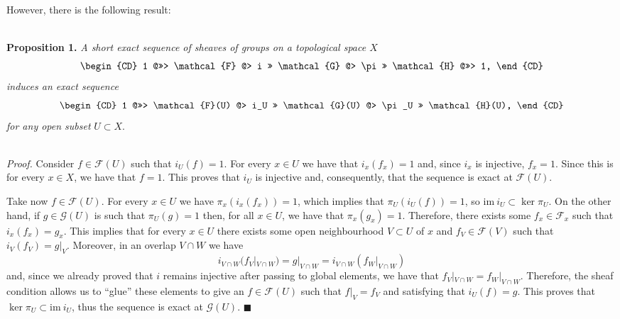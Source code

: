     However, there is the following result:

    \ \\
    \textbf{Proposition 1.} \textit{A short exact sequence of sheaves of groups on a topological space $X$}
    \begin{equation*}
      \begin{CD}
1 @>>>	\mathcal{F} @> i >> \mathcal{G} @> \pi >> \mathcal{H} @>>> 1,
      \end{CD}
    \end{equation*}
    \textit{induces an exact sequence}
    \begin{equation*}
      \begin{CD}
1 @>>>	\mathcal{F}(U) @> i_U >> \mathcal{G}(U) @> \pi_U >> \mathcal{H}(U),
      \end{CD}
    \end{equation*}
    \textit{for any open subset} $U\subset X$.

    \ \\
    \textit{Proof.} Consider $f\in \mathcal{F}(U)$ such that $i_U(f)=1$. For every $x\in U$ we have that $i_x(f_x)=1$ and, since $i_x$ is injective, $f_x=1$. Since this is for every $x\in X$, we have that $f=1$. This proves that $i_U$ is injective and, consequently, that the sequence is exact at $\mathcal{F}(U)$.

    Take now $f\in \mathcal{F}(U)$. For every $x\in U$ we have $\pi_x(i_x(f_x))=1$, which implies that $\pi_U(i_U(f))=1$, so $\mathrm{im}\ i_U \subset \ker \pi_U$. On the other hand, if $g\in \mathcal{G}(U)$ is such that $\pi_U(g)=1$ then, for all $x\in U$, we have that $\pi_x(g_x)=1$. Therefore, there exists some $f_x \in \mathcal{F}_x$ such that $i_x(f_x)=g_x$. This implies that for every $x\in U$ there exists some open neighbourhood $V\subset U$ of $x$ and $f_V \in \mathcal{F}(V)$ such that $i_V(f_V)=g|_V$. Moreover, in an overlap $V\cap W$ we have
    \begin{equation*}
      i_{V\cap W}( f_V|_{V\cap W})= g|_{V\cap W} = i_{V\cap W}(f_W|_{V\cap W})
    \end{equation*}
    and, since we already proved that $i$ remains injective after passing to global elements, we have that $ f_V|_{V\cap W}=f_W|_{V\cap W}$. Therefore, the sheaf condition allows us to ``glue'' these elements to give an $f \in \mathcal{F}(U)$ such that $f|_V=f_V$ and satisfying that $i_U(f)=g$. This proves that $\ker \pi_U \subset \mathrm{im}\ i_U$, thus the sequence is exact at $\mathcal{G}(U)$. \hfill $\blacksquare$
    \ \\

